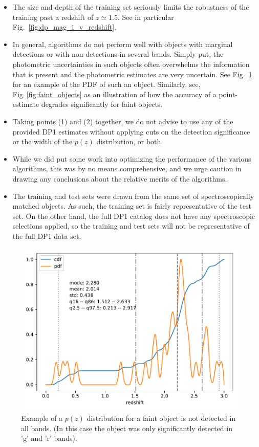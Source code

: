 \begin{itemize}
\item{The size and depth of the training set seriously limits the robustness of the training past a redshift of $z \simeq 1.5$.  See in particular Fig.~\ref{fig:dp_mag_i_v_redshift}.}
\item{In general, \photoz algorithms do not perform well with objects with marginal detections or with non-detections in several bands.  Simply put, the photometric uncertainties in such objects often overwhelms the information that is present and the photometric estimates are very uncertain.  See Fig.~\ref{fig:faint_object_pdf} for an example of the PDF of such an object.   Similarly, see, Fig~\ref{fig:faint_objects} as an illustration of how the accuracy of a \photoz point-estimate degrades significantly for faint objects.}
\item{Taking points (1) and (2) together, we do not advise to use any of the provided DP1 \photoz estimates without applying cuts on the detection significance or the width of the $p(z)$ distribution, or both.}
\item{While we did put some work into optimizing the performance of the various algorithms, this was by no means comprehensive, and we urge caution in drawing any conclusions about the relative merits of the algorithms.}
\item{The training and test sets were drawn from the same set of spectroscopically matched objects.  As such, the training set is fairly representative of the test set.   On the other hand, the full DP1 catalog does not have any spectroscopic selections applied, so the training and test sets will not be representative of the full DP1 data set.}
\end{itemize}

\begin{figure}
    \centering
    \includegraphics[width=0.45\linewidth]{figures/bad_pdf.pdf}
    \caption{Example of a $p(z)$ distribution for a faint object is not detected in all bands.  (In this case the object was only significantly detected in 'g' and 'r' bands).}
    \label{fig:faint_object_pdf}
\end{figure}

